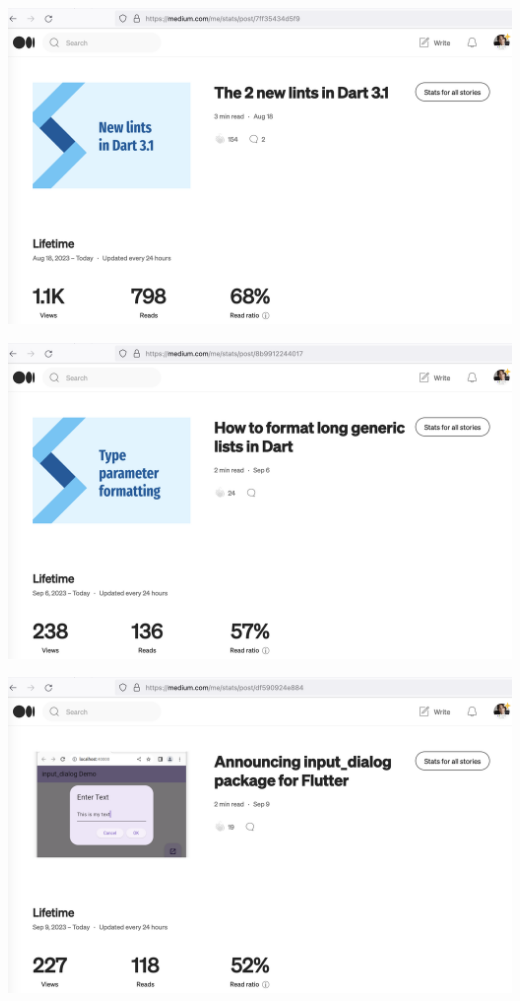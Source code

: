 \begin{center}
    \includegraphics[width=\textwidth]{2023-08-18_lints}
\end{center}

\begin{center}
    \includegraphics[width=\textwidth]{2023-09-06_format}
\end{center}

\begin{center}
    \includegraphics[width=\textwidth]{2023-09-09_dialog}
\end{center}

